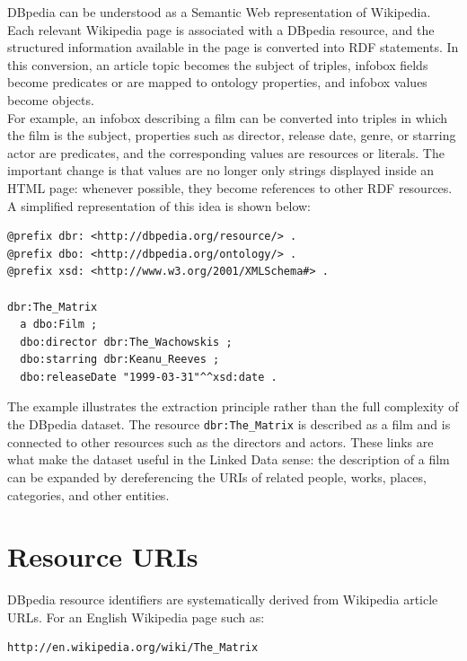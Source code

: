 \documentclass{scrbook}
\begin{document}
	DBpedia can be understood as a Semantic Web representation of Wikipedia. Each relevant Wikipedia page is associated with a DBpedia resource, and the structured information available in the page is converted into RDF statements. In this conversion, an article topic becomes the subject of triples, infobox fields become predicates or are mapped to ontology properties, and infobox values become objects.\\
	
	For example, an infobox describing a film can be converted into triples in which the film is the subject, properties such as director, release date, genre, or starring actor are predicates, and the corresponding values are resources or literals. The important change is that values are no longer only strings displayed inside an HTML page: whenever possible, they become references to other RDF resources.\\
	
	A simplified representation of this idea is shown below:
	
	\begin{lstlisting}
@prefix dbr: <http://dbpedia.org/resource/> .
@prefix dbo: <http://dbpedia.org/ontology/> .
@prefix xsd: <http://www.w3.org/2001/XMLSchema#> .

dbr:The_Matrix
  a dbo:Film ;
  dbo:director dbr:The_Wachowskis ;
  dbo:starring dbr:Keanu_Reeves ;
  dbo:releaseDate "1999-03-31"^^xsd:date .
	\end{lstlisting}
	
	The example illustrates the extraction principle rather than the full complexity of the DBpedia dataset. The resource \texttt{dbr:The\_Matrix} is described as a film and is connected to other resources such as the directors and actors. These links are what make the dataset useful in the Linked Data sense: the description of a film can be expanded by dereferencing the URIs of related people, works, places, categories, and other entities.
	
	\section{Resource URIs}
	
	DBpedia resource identifiers are systematically derived from Wikipedia article URLs. For an English Wikipedia page such as:
	
	\begin{lstlisting}
http://en.wikipedia.org/wiki/The_Matrix
	\end{lstlisting}
	
\end{document}
